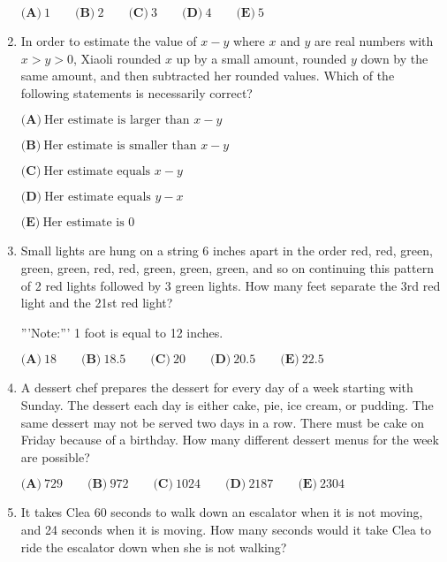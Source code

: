 \documentclass{article}
\begin{document}
\begin{enumerate}[label=\arabic*., itemsep=0.5em]
\(\textbf{(A)}\ 1\qquad\textbf{(B)}\ 2\qquad\textbf{(C)}\ 3\qquad\textbf{(D)}\ 4\qquad\textbf{(E)}\ 5\)\par \vspace{0.5em}\item In order to estimate the value of \(x-y\) where \(x\) and \(y\) are real numbers with \(x > y > 0\), Xiaoli rounded \(x\) up by a small amount, rounded \(y\) down by the same amount, and then subtracted her rounded values. Which of the following statements is necessarily correct?

\(\textbf{(A)}\ \text{Her estimate is larger than }x-y\)

\(\textbf{(B)}\ \text{Her estimate is smaller than }x-y\)

\(\textbf{(C)}\ \text{Her estimate equals }x-y\)

\(\textbf{(D)}\ \text{Her estimate equals }y - x\)

\(\textbf{(E)}\ \text{Her estimate is 0}\)\par \vspace{0.5em}\item Small lights are hung on a string 6 inches apart in the order red, red, green, green, green, red, red, green, green, green, and so on continuing this pattern of 2 red lights followed by 3 green lights. How many feet separate the 3rd red light and the 21st red light?

'''Note:''' 1 foot is equal to 12 inches.

\(\textbf{(A)}\ 18\qquad\textbf{(B)}\ 18.5\qquad\textbf{(C)}\ 20\qquad\textbf{(D)}\ 20.5\qquad\textbf{(E)}\ 22.5 \)\par \vspace{0.5em}\item A dessert chef prepares the dessert for every day of a week starting with Sunday. The dessert each day is either cake, pie, ice cream, or pudding. The same dessert may not be served two days in a row. There must be cake on Friday because of a birthday. How many different dessert menus for the week are possible?

\(\textbf{(A)}\ 729\qquad\textbf{(B)}\ 972\qquad\textbf{(C)}\ 1024\qquad\textbf{(D)}\ 2187\qquad\textbf{(E)}\ 2304 \)\par \vspace{0.5em}\item It takes Clea 60 seconds to walk down an escalator when it is not moving, and 24 seconds when it is moving. How many seconds would it take Clea to ride the escalator down when she is not walking?


\end{enumerate}
\end{document}
